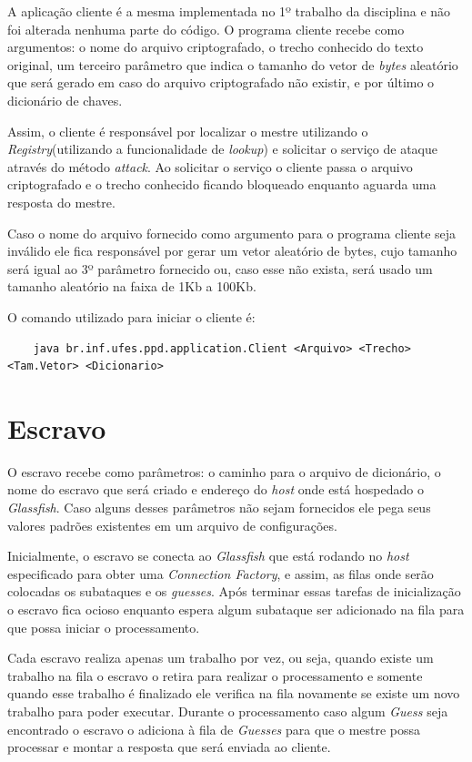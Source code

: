 \documentclass[
	12pt,				%
    oneside,			%
	a4paper,			%
	english,			%
	brazil,				%
	]{abntex2}
\begin{document}
A aplicação cliente é a mesma implementada no 1º trabalho da disciplina e não foi alterada nenhuma parte do código. O programa cliente recebe como argumentos: o nome do arquivo criptografado, o trecho conhecido do texto original, um terceiro parâmetro que indica o tamanho do vetor de \textit{bytes} aleatório que será gerado em caso do arquivo criptografado não existir, e por último o dicionário de chaves.

Assim, o cliente é responsável por localizar o mestre utilizando o \textit{Registry}(utilizando a funcionalidade de \textit{lookup}) e solicitar o serviço de ataque através do método \textit{attack}. Ao solicitar o serviço o cliente passa o arquivo criptografado e o trecho conhecido ficando bloqueado enquanto aguarda uma resposta do mestre.

Caso o nome do arquivo fornecido como argumento para o programa cliente seja inválido ele fica responsável por gerar um vetor aleatório de bytes, cujo tamanho será igual ao 3º parâmetro fornecido ou, caso esse não exista, será usado um tamanho aleatório na faixa de 1Kb a 100Kb.

O comando utilizado para iniciar o cliente é:

\begin{lstlisting}
	java br.inf.ufes.ppd.application.Client <Arquivo> <Trecho> <Tam.Vetor> <Dicionario>
\end{lstlisting}


\section{Escravo}
O escravo recebe como parâmetros: o caminho para o arquivo de dicionário, o nome do escravo que será criado e endereço do \textit{host} onde está hospedado o \textit{Glassfish}. Caso alguns desses parâmetros não sejam fornecidos ele pega seus valores padrões existentes em um arquivo de configurações.

Inicialmente, o escravo se conecta ao \textit{Glassfish} que está rodando no \textit{host} especificado para obter uma \textit{Connection Factory}, e assim, as filas onde serão colocadas os subataques e os \textit{guesses}. Após terminar essas tarefas de inicialização o escravo fica ocioso enquanto espera algum subataque ser adicionado na fila para que possa iniciar o processamento. 

Cada escravo realiza apenas um trabalho por vez, ou seja, quando existe um trabalho na fila o escravo o retira para realizar o processamento e somente quando esse trabalho é finalizado ele verifica na fila novamente se existe um novo trabalho para poder executar. Durante o processamento caso algum \textit{Guess} seja encontrado o escravo o adiciona à fila de \textit{Guesses} para que o mestre possa processar e montar a resposta que será enviada ao cliente.
\end{document}
